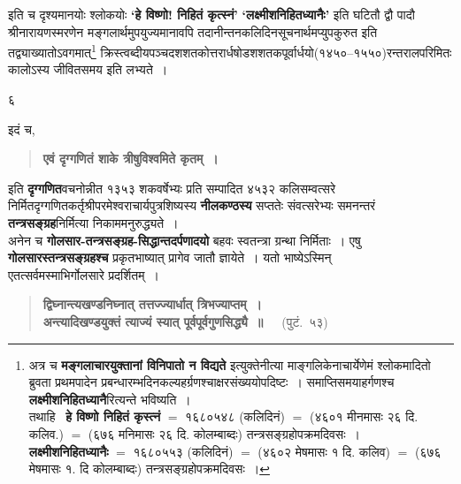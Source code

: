 \documentclass[11pt, openany]{book}
\begin{document}
\begin{sloppypar}
\noindent इति च दृश्यमानयोः श्लोकयोः \textbf{`हे विष्णो! निहितं कृत्स्नं'} \textbf{`लक्ष्मीशनिहितध्यानैः'} इति घटितौ द्वौ पादौ श्रीनारायणस्मरणेन मङ्गलार्थमुपयुज्यमानावपि तदानीन्तनकलिदिनसूचनार्थमप्युपकुरुत इति तद्व्याख्यातोऽवगमात्\renewcommand{\thefootnote}{*}\footnote{अत्र च \textbf{मङ्गलाचारयुक्तानां विनिपातो न विद्यते} इत्युक्तेनीत्या माङ्गलिकेनाचार्येणेमं श्लोकमादितो ब्रुवता प्रथमपादेन प्रबन्धारम्भदिनकल्यहर्ग्रणश्चाक्षरसंख्ययोपदिष्टः~। समाप्तिसमयाहर्गणश्च \textbf{लक्ष्मीशनिहितध्यानै}रित्यन्ते भविष्यति~। \\

तथाहि \textendash\ \textbf{हे विष्णो निहितं कृस्त्नं}  $=$ १६८०५४८ (कलिदिनं) $=$ (४६०१
मीनमासः २६ दि. कलिव.) $=$ (६७६ मनिमासः २६ दि. कोलम्बाब्दः) \hspace{1cm} तन्त्रसङ्ग्रहोपक्रमदिवसः~।\\
	
\textbf{लक्ष्मीशनिहितध्यानैः} $=$ १६८०५५३ (कलिदिनं) $=$ (४६०२ मेषमासः १ दि. कलिव) $=$ (६७६ मेषमासः १. दि कोलम्बाब्दः) \hspace{1cm} तन्त्रसङ्ग्रहोपक्रमदिवसः~।}
क्रिस्त्वब्दीयपञ्चदशशतकोत्तरार्धषोडशशतकपूर्वार्धयो(१४५०--१५५०)रन्तरालपरिमितः कालोऽस्य जीवितसमय इति लभ्यते~। 
\end{sloppypar} 
\newpage

\begin{center}
	६
\end{center}
\thispagestyle{empty}
इदं च,

\begin{quote} 
\textbf{एवं दृग्गणितं शाके त्रीषुविश्वमिते कृतम्~।}
\end{quote}

\noindent इति \textbf{दृग्गणित}वचनोन्नीत १३५३ शकवर्षेभ्यः प्रति सम्पादित ४५३२ कलिसम्वत्सरे निर्मितदृग्गणितकर्तृश्रीपरमेश्वराचार्यपुत्रशिष्यस्य
\textbf{नीलकण्ठस्य} सप्ततेः संवत्सरेभ्यः समनन्तरं \textbf{तन्त्रसङ्ग्रह}निर्मित्या निकाममनुरुद्ध्यते~।\\

अनेन च \textbf{गोलसार-तन्त्रसङ्ग्रह-सिद्धान्तदर्पणादयो} बहवः स्वतन्त्रा ग्रन्था निर्मिताः~। एषु \textbf{गोलसारस्तन्त्रसङ्ग्रहश्च} प्रकृतभाष्यात् प्रागेव जातौ ज्ञायेते~। यतो भाष्येऽस्मिन्\textendash \\

एतत्सर्वमस्माभिर्गोलसारे प्रदर्शितम्~।
\begin{quote}
\textbf{द्विघ्नान्त्यखण्डनिघ्नात् तत्तज्ज्यार्धात् त्रिभज्याप्तम्~।\\
अन्त्यादिखण्डयुक्तं त्याज्यं स्यात् पूर्वपूर्वगुणसिद्ध्यै~॥}~~~(पुटं.~५३)
\end{quote}
 
\end{document}
